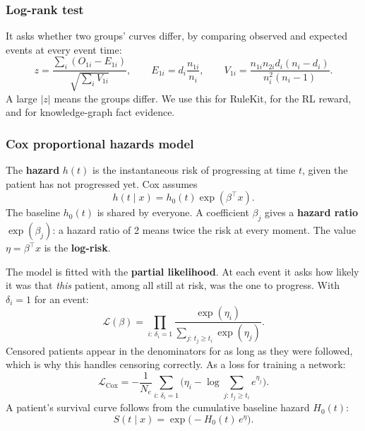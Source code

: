 \documentclass[11pt,a4paper]{article}
\newcommand{\term}[1]{\textbf{#1}}
\begin{document}
\subsubsection{Log-rank test}
It asks whether two groups' curves differ, by comparing observed and expected events at every event time:
\begin{equation}
z=\frac{\sum_i (O_{1i}-E_{1i})}{\sqrt{\sum_i V_{1i}}},\qquad E_{1i}=d_i\frac{n_{1i}}{n_i},\qquad V_{1i}=\frac{n_{1i}n_{2i}d_i(n_i-d_i)}{n_i^2(n_i-1)}.
\end{equation}
A large $|z|$ means the groups differ. We use this for RuleKit, for the RL reward, and for knowledge-graph fact evidence.

\subsubsection{Cox proportional hazards model}
The \term{hazard} $h(t)$ is the instantaneous risk of progressing at time $t$, given the patient has not progressed yet. Cox assumes
\begin{equation}
h(t\mid x)=h_0(t)\exp(\beta^\top x).
\end{equation}
The baseline $h_0(t)$ is shared by everyone. A coefficient $\beta_j$ gives a \term{hazard ratio} $\exp(\beta_j)$: a hazard ratio of 2 means twice the risk at every moment. The value $\eta=\beta^\top x$ is the \term{log-risk}.

The model is fitted with the \term{partial likelihood}. At each event it asks how likely it was that \emph{this} patient, among all still at risk, was the one to progress. With $\delta_i=1$ for an event:
\begin{equation}
\mathcal{L}(\beta)=\prod_{i:\,\delta_i=1}\frac{\exp(\eta_i)}{\sum_{j:\,t_j\ge t_i}\exp(\eta_j)}.
\end{equation}
Censored patients appear in the denominators for as long as they were followed, which is why this handles censoring correctly. As a loss for training a network:
\begin{equation}
\mathcal{L}_{\text{Cox}}=-\frac{1}{N_e}\sum_{i:\,\delta_i=1}\Big(\eta_i-\log\!\sum_{j:\,t_j\ge t_i}e^{\eta_j}\Big).
\end{equation}
A patient's survival curve follows from the cumulative baseline hazard $H_0(t)$:
\begin{equation}
S(t\mid x)=\exp\big(-H_0(t)\,e^{\eta}\big).
\end{equation}
\end{document}
